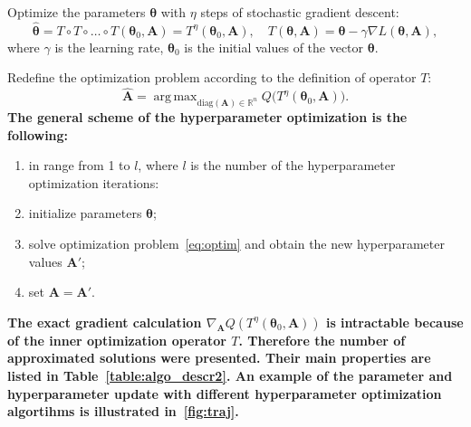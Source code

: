\documentclass[smallcondensed]{svjour3}
\DeclareMathOperator*{\argmax}{arg\,max}
\begin{document}
Optimize the parameters  $\boldsymbol{\theta}$ with $\eta$ steps of stochastic gradient descent:
\begin{equation}
\label{eq:gd}
	 \hat{\boldsymbol{\theta}} = T \circ T \circ \dots \circ T(\boldsymbol{\theta}_0, \mathbf{A}) = T^\eta(\boldsymbol{\theta}_0, \mathbf{A}), \quad 	T(\boldsymbol{\theta}, \mathbf{A}) =\boldsymbol{\theta} - \gamma \nabla L(\boldsymbol{\theta}, \mathbf{A}), 
\end{equation}
where $\gamma$ is the learning rate, $\boldsymbol{\theta}_0$ is the initial values of the vector $\boldsymbol{\theta}$. 

Redefine the optimization problem according to the definition of operator $T$:
\begin{equation}
\label{eq:optim}
	\hat{\mathbf{A}} = \argmax_{\text{diag}(\mathbf{A}) \in \mathbb{R}^n} Q\bigl( T^\eta(\boldsymbol{\theta}_0, \mathbf{A})\bigr).
\end{equation}
\textbf{
The general scheme of the hyperparameter optimization is the following:}
\begin{enumerate}
\item in range from 1 to  $l$, where $l$ is the number of the hyperparameter optimization iterations:
\item initialize parameters $\boldsymbol{\theta}$;
\item solve optimization problem~\eqref{eq:optim} and obtain the new hyperparameter values $\mathbf{A}'$;
\item set $\mathbf{A} = \mathbf{A}'$.
\end{enumerate}
\textbf{
The exact gradient calculation $\nabla_{\mathbf{A}} Q( T^\eta(\boldsymbol{\theta}_0, \mathbf{A}))$ is intractable because of the inner optimization operator $T$. Therefore the number of approximated solutions were presented. Their main properties are listed in Table~\ref{table:algo_descr2}. An example of the parameter and hyperparameter update with different hyperparameter optimization algortihms is illustrated in~\ref{fig:traj}.
}
\end{document}
